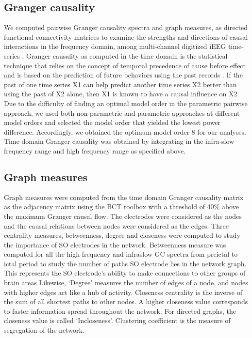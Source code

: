 \subsection{Granger causality}
We computed pairwise Granger causality spectra and graph measures, as directed functional connectivity matrices to examine the strengths and directions of causal interactions in the frequency domain, among multi-channel digitized iEEG time-series \citep{dhamala2008analyzing}. Granger causality as computed in the time domain is the statistical technique that relies on the concept of temporal precedence of cause before effect and is based on the prediction of future behaviors using the past records \citep{granger1969investigating}. If the past of one time series X1 can help predict another time series X2 better than using the past of X2 alone, then X1 is known to have a causal influence on X2. Due to the difficulty of finding an optimal model order in the parametric pairwise approach, we used both non-parametric and parametric approaches at different model orders and selected the model order that yielded the lowest power difference. Accordingly, we obtained the optimum model order 8 for our analyses. Time domain Granger causality was obtained by integrating in the infra-slow frequency range and high frequency range as specified above.

\subsection{Graph measures}
Graph measures were computed from the time domain Granger causality matrix as the adjacency matrix using the BCT toolbox \citep{rubinov2010complex} with a threshold of 40\% above the maximum Granger causal flow. The electrodes were considered as the nodes and the causal relations between nodes were considered as the edges. Three centrality measures, betweenness, degree and closeness were computed to study the importance of SO electrodes in the network. Betweenness measure was computed for all the high-frequency and infraslow GC spectra from preictal to ictal period to study the number of paths SO electrode lies in the network graph. This represents the SO electrode's ability to make connections to other groups of brain areas \citep{chiang2014graph,wang2008betweenness}
Likewise, ‘Degree’ measures the number of edges of a node, and nodes with higher edges act like a hub of activity. Closeness centrality is the inverse of the sum of all shortest paths to other nodes. A higher closeness value corresponds to faster information spread throughout the network. For directed graphs, the closeness value is called ‘Incloseness’. Clustering coefficient is the measure of segregation of the network.


